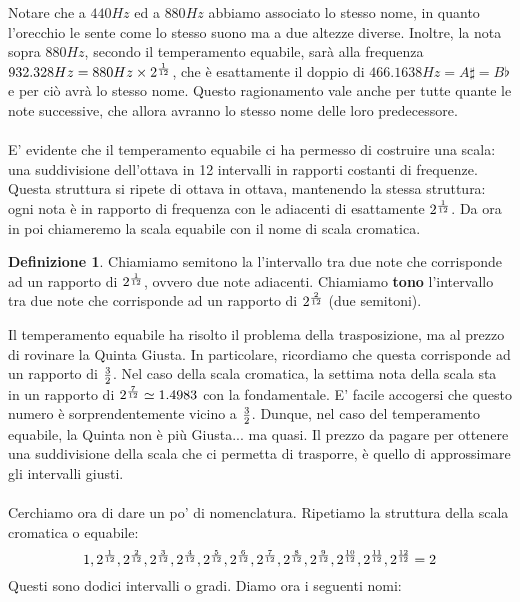 \documentclass[12pt,a4paper]{report}
\theoremstyle{definition}
\newtheorem{Def}{Definizione}[chapter]
\theoremstyle{Theorem}
\theoremstyle{definition}
\theoremstyle{definition}
\theoremstyle{definition}
\begin{document}
	 Notare che a $440Hz$ ed a $880Hz$ abbiamo associato lo stesso nome, in quanto l'orecchio le sente come lo stesso suono ma a due altezze diverse. Inoltre, la nota sopra $880Hz$, secondo il temperamento equabile, sarà alla frequenza $932.328 Hz=880 Hz\times 2^{1\over 12}$, che è esattamente il doppio di $466.1638 Hz=A\sharp=B\flat$ e per ciò avrà lo stesso nome. Questo ragionamento vale anche per tutte quante le note successive, che allora avranno lo stesso nome delle loro predecessore.\\
	 \\
	 E' evidente che il temperamento equabile ci ha permesso di costruire una scala: una suddivisione dell'ottava in 12 intervalli in rapporti costanti di frequenze. Questa struttura si ripete di ottava in ottava, mantenendo la stessa struttura: ogni nota è in rapporto di frequenza con le adiacenti di esattamente $2^{1\over 12}$.
	 Da ora in poi chiameremo la scala equabile con il nome di scala cromatica. 
	 \begin{Def}
	 	Chiamiamo semitono la l'intervallo tra due note che corrisponde ad un rapporto di $2^{1\over12}$, ovvero due note adiacenti. Chiamiamo \textbf{tono} l'intervallo tra due note che corrisponde ad un rapporto di $2^{2\over 12}$ (due semitoni).
	 \end{Def} 
	 Il temperamento equabile ha risolto il problema della trasposizione, ma al prezzo di rovinare la Quinta Giusta. In particolare, ricordiamo che questa corrisponde ad un rapporto di $3\over 2$. Nel caso della scala cromatica, la settima nota della scala sta in un rapporto di $2^{7\over 12}\simeq 1.4983$ con la fondamentale. E' facile accogersi che questo numero è sorprendentemente vicino a $3\over 2$. Dunque, nel caso del temperamento equabile, la Quinta non è più Giusta... ma quasi. Il prezzo da pagare per ottenere una suddivisione della scala che ci permetta di trasporre, è quello di approssimare gli intervalli giusti.\\
	 \\
	 Cerchiamo ora di dare un po' di nomenclatura. Ripetiamo la struttura della scala cromatica o equabile:
	 $$1,2^{1\over12},2^{2\over12},2^{3\over12},2^{4\over12},2^{5\over12},2^{6\over12},2^{7\over12},2^{8\over12},2^{9\over12},2^{10\over12},2^{11\over12},2^{12\over12}=2$$
	 Questi sono dodici intervalli o gradi. Diamo ora i seguenti nomi:
\end{document}
